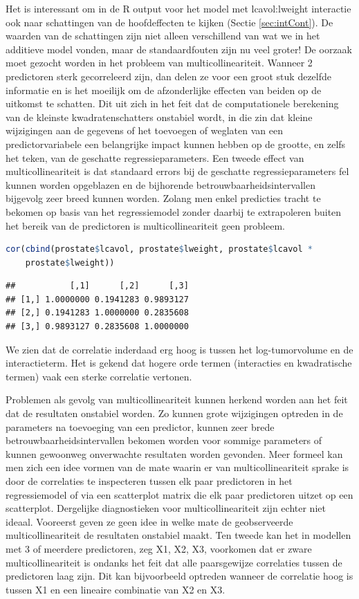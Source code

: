 \documentclass[
  12pt,dutch,coursenotes]{book}
\theoremstyle{definition}
\theoremstyle{definition}
\theoremstyle{definition}
\theoremstyle{definition}
\theoremstyle{remark}
\begin{document}
Het is interessant om in de R output voor het model met lcavol:lweight interactie ook naar schattingen van de hoofdeffecten te kijken (Sectie \ref{sec:intCont}).
De waarden van de schattingen zijn niet alleen verschillend van wat we in het additieve model vonden, maar de standaardfouten zijn nu veel groter!
De oorzaak moet gezocht worden in het probleem van multicollineariteit.
Wanneer 2 predictoren sterk gecorreleerd zijn, dan delen ze voor een groot stuk dezelfde informatie en is het moeilijk om de afzonderlijke effecten van beiden op de uitkomst te schatten. Dit uit zich in het feit dat de computationele berekening van de kleinste kwadratenschatters onstabiel wordt, in die zin dat kleine wijzigingen aan de gegevens of het toevoegen of weglaten van een predictorvariabele een belangrijke impact kunnen hebben op de grootte, en zelfs het teken, van de geschatte regressieparameters.
Een tweede effect van multicollineariteit is dat standaard errors bij de geschatte regressieparameters fel kunnen worden opgeblazen en de bijhorende betrouwbaarheidsintervallen bijgevolg zeer breed kunnen worden. Zolang men enkel predicties tracht te bekomen op basis van het regressiemodel zonder daarbij te extrapoleren buiten het bereik van de predictoren is multicollineariteit geen probleem.

\begin{lstlisting}[language=R]
cor(cbind(prostate$lcavol, prostate$lweight, prostate$lcavol *
    prostate$lweight))
\end{lstlisting}

\begin{lstlisting}
##           [,1]      [,2]      [,3]
## [1,] 1.0000000 0.1941283 0.9893127
## [2,] 0.1941283 1.0000000 0.2835608
## [3,] 0.9893127 0.2835608 1.0000000
\end{lstlisting}

We zien dat de correlatie inderdaad erg hoog is tussen het log-tumorvolume en de interactieterm.
Het is gekend dat hogere orde termen (interacties en kwadratische termen) vaak een sterke correlatie vertonen.

Problemen als gevolg van multicollineariteit kunnen herkend worden aan het feit dat de resultaten onstabiel worden. Zo kunnen grote wijzigingen optreden in de parameters na toevoeging van een predictor, kunnen zeer brede betrouwbaarheidsintervallen bekomen worden voor sommige parameters of kunnen gewoonweg onverwachte resultaten worden gevonden. Meer formeel kan men zich een idee vormen van de mate waarin er van multicollineariteit sprake is door de correlaties te inspecteren tussen elk paar predictoren in het regressiemodel of via een scatterplot matrix die elk paar predictoren uitzet op een scatterplot.
Dergelijke diagnostieken voor multicollineariteit zijn echter niet ideaal.
Vooreerst geven ze geen idee in welke mate de geobserveerde multicollineariteit de resultaten onstabiel maakt.
Ten tweede kan het in modellen met 3 of meerdere predictoren, zeg X1, X2, X3, voorkomen dat er zware multicollineariteit is ondanks het feit dat alle paarsgewijze correlaties tussen de predictoren laag zijn.
Dit kan bijvoorbeeld optreden wanneer de correlatie hoog is tussen X1 en een lineaire combinatie van X2 en X3.
\end{document}
